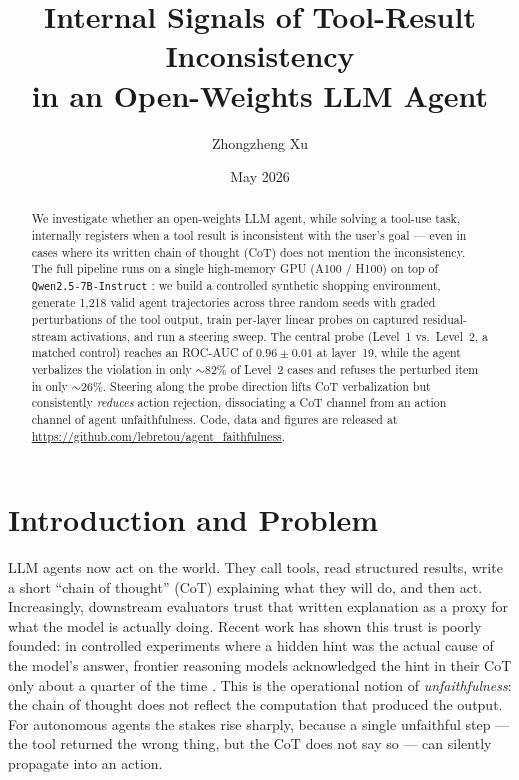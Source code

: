 \documentclass[11pt]{article}
\title{\textbf{Internal Signals of Tool-Result Inconsistency \\
in an Open-Weights LLM Agent}}
\author{Zhongzheng Xu}
\date{May 2026}
\begin{document}
\maketitle

\begin{abstract}
\noindent
We investigate whether an open-weights LLM agent, while solving a tool-use
task, internally registers when a tool result is inconsistent with the user's
goal --- even in cases where its written chain of thought (CoT) does not
mention the inconsistency. The full pipeline runs on a single high-memory
GPU (A100 / H100) on top of \texttt{Qwen2.5-7B-Instruct} \citep{qwen25}: we
build a controlled synthetic shopping environment, generate 1{,}218 valid
agent trajectories across three random seeds with graded perturbations of the
tool output, train per-layer linear probes on captured residual-stream
activations, and run a steering sweep. The central probe (Level~1 vs.\
Level~2, a matched control) reaches an ROC-AUC of $0.96 \pm 0.01$ at
layer~19, while the agent verbalizes the violation in only $\sim$82\% of
Level~2 cases and refuses the perturbed item in only $\sim$26\%. Steering
along the probe direction lifts CoT verbalization but consistently
\emph{reduces} action rejection, dissociating a CoT channel from an action
channel of agent unfaithfulness. Code, data and figures are released at
\url{https://github.com/lebretou/agent_faithfulness}.
\end{abstract}

\section{Introduction and Problem}

LLM agents now act on the world. They call tools, read structured results,
write a short ``chain of thought'' (CoT) explaining what they will do, and
then act. Increasingly, downstream evaluators trust that written explanation
as a proxy for what the model is actually doing. Recent work has shown this
trust is poorly founded: in controlled experiments where a hidden hint was
the actual cause of the model's answer, frontier reasoning models acknowledged
the hint in their CoT only about a quarter of the time \citep{chen2025faith}.
This is the operational notion of \emph{unfaithfulness}: the chain of thought
does not reflect the computation that produced the output. For autonomous
agents the stakes rise sharply, because a single unfaithful step --- the tool
returned the wrong thing, but the CoT does not say so --- can silently
propagate into an action.
\end{document}
